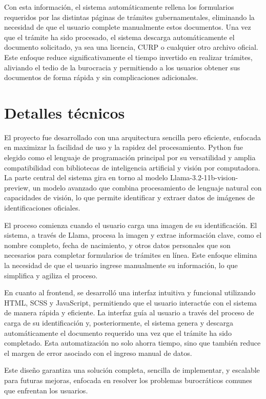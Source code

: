 \documentclass[a4paper,12pt]{article}
\begin{document}
Con esta información, el sistema automáticamente rellena los formularios requeridos por las distintas páginas de trámites gubernamentales, eliminando la necesidad de que el usuario complete manualmente estos documentos. Una vez que el trámite ha sido procesado, el sistema descarga automáticamente el documento solicitado, ya sea una licencia, CURP o cualquier otro archivo oficial. Este enfoque reduce significativamente el tiempo invertido en realizar trámites, aliviando el tedio de la burocracia y permitiendo a los usuarios obtener sus documentos de forma rápida y sin complicaciones adicionales.

\section{Detalles técnicos}
El proyecto fue desarrollado con una arquitectura sencilla pero eficiente, enfocada en maximizar la facilidad de uso y la rapidez del procesamiento. Python fue elegido como el lenguaje de programación principal por su versatilidad y amplia compatibilidad con bibliotecas de inteligencia artificial y visión por computadora. La parte central del sistema gira en torno al modelo Llama-3.2-11b-vision-preview, un modelo avanzado que combina procesamiento de lenguaje natural con capacidades de visión, lo que permite identificar y extraer datos de imágenes de identificaciones oficiales.

El proceso comienza cuando el usuario carga una imagen de su identificación. El sistema, a través de Llama, procesa la imagen y extrae información clave, como el nombre completo, fecha de nacimiento, y otros datos personales que son necesarios para completar formularios de trámites en línea. Este enfoque elimina la necesidad de que el usuario ingrese manualmente su información, lo que simplifica y agiliza el proceso.

En cuanto al frontend, se desarrolló una interfaz intuitiva y funcional utilizando HTML, SCSS y JavaScript, permitiendo que el usuario interactúe con el sistema de manera rápida y eficiente. La interfaz guía al usuario a través del proceso de carga de su identificación y, posteriormente, el sistema genera y descarga automáticamente el documento requerido una vez que el trámite ha sido completado. Esta automatización no solo ahorra tiempo, sino que también reduce el margen de error asociado con el ingreso manual de datos. 

Este diseño garantiza una solución completa, sencilla de implementar, y escalable para futuras mejoras, enfocada en resolver los problemas burocráticos comunes que enfrentan los usuarios.
\end{document}
